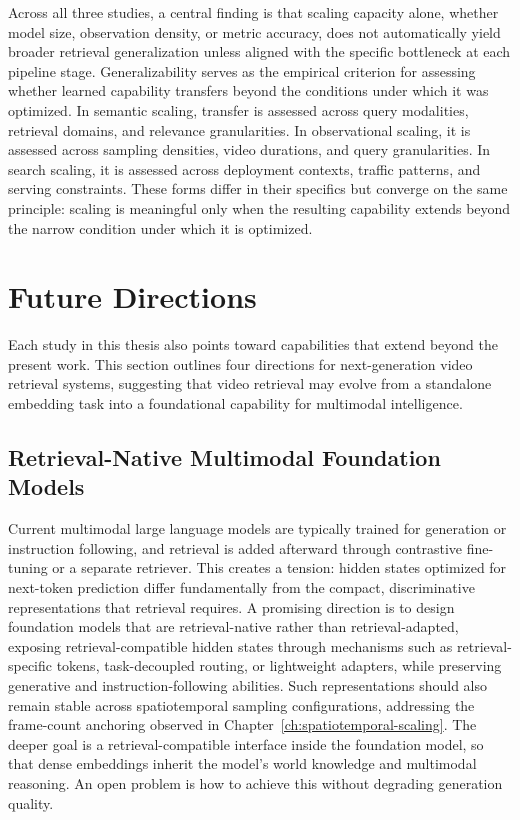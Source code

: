 Across all three studies, a central finding is that scaling capacity alone, whether model size, observation density, or metric accuracy, does not automatically yield broader retrieval generalization unless aligned with the specific bottleneck at each pipeline stage. Generalizability serves as the empirical criterion for assessing whether learned capability transfers beyond the conditions under which it was optimized. In semantic scaling, transfer is assessed across query modalities, retrieval domains, and relevance granularities. In observational scaling, it is assessed across sampling densities, video durations, and query granularities. In search scaling, it is assessed across deployment contexts, traffic patterns, and serving constraints. These forms differ in their specifics but converge on the same principle: scaling is meaningful only when the resulting capability extends beyond the narrow condition under which it is optimized.

\section{Future Directions}
\label{sec:future-works}

Each study in this thesis also points toward capabilities that extend beyond the present work. This section outlines four directions for next-generation video retrieval systems, suggesting that video retrieval may evolve from a standalone embedding task into a foundational capability for multimodal intelligence.

\subsection{Retrieval-Native Multimodal Foundation Models}

Current multimodal large language models are typically trained for generation or instruction following, and retrieval is added afterward through contrastive fine-tuning or a separate retriever. This creates a tension: hidden states optimized for next-token prediction differ fundamentally from the compact, discriminative representations that retrieval requires. A promising direction is to design foundation models that are retrieval-native rather than retrieval-adapted, exposing retrieval-compatible hidden states through mechanisms such as retrieval-specific tokens, task-decoupled routing, or lightweight adapters, while preserving generative and instruction-following abilities. Such representations should also remain stable across spatiotemporal sampling configurations, addressing the frame-count anchoring observed in Chapter~\ref{ch:spatiotemporal-scaling}. The deeper goal is a retrieval-compatible interface inside the foundation model, so that dense embeddings inherit the model's world knowledge and multimodal reasoning. An open problem is how to achieve this without degrading generation quality.

